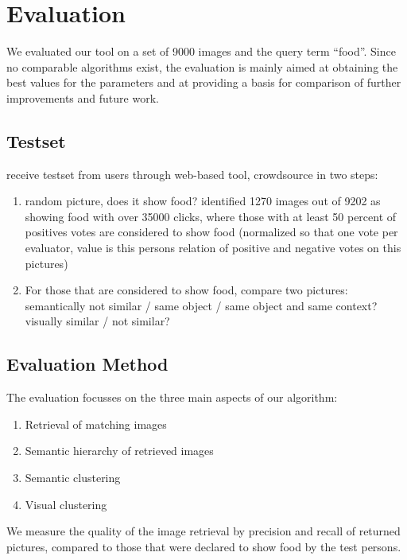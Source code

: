 %
\section{Evaluation}
\label{sec_literatur}

We evaluated our tool on a set of 9000  images and the query term ``food''. Since no comparable algorithms exist, the evaluation is mainly aimed at obtaining the best values for the parameters and at providing a basis for comparison of further improvements and future work.\\

\subsection{Testset}
receive testset from users through web-based tool, crowdsource in two steps: \\

\begin{enumerate}
\item random picture, does it show food? identified 1270 images out of 9202 as showing food with over 35000 clicks, where those with at least 50 percent of positives votes are considered to show food (normalized so that one vote per evaluator, value is this persons relation of positive and negative votes on this pictures) \\
\item For those that are considered to show food, compare two pictures: semantically not similar / same object / same object and same context? visually similar / not similar?\\
\end{enumerate}

\subsection{Evaluation Method}
The evaluation focusses on the three main aspects of our algorithm:
\begin{enumerate}
\item Retrieval of matching images
\item Semantic hierarchy of retrieved images
\item Semantic clustering
\item Visual clustering
\end{enumerate}

We measure the quality of the image retrieval by precision and recall of returned pictures, compared to those that were declared to show food by the test persons. 

